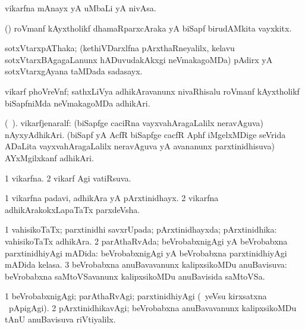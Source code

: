 \bentry
{} 
\gl{\nA}
\expl{}
\bmng
 vikarfna mAnayx yA uMbaLi yA nivAsa. 
\emng
\eentry

\bentry
{}
\gl{\nA}
\expl{}
\bmng
 (\roVkAyx) roVmanf kAyxtholikf dhamaRparxcAraka yA biSapf birudAMkita vayxkitx. 
\emng
\eentry

\bentry
{}
\gl{\nA}
\expl{}
\bmng
 sotxVtarxpAThaka; (kethiVDarxlfna pArxthaRneyalilx, kelavu sotxVtarxBAgagaLanunx hADuvudakAkxgi neVmakagoMDa) pAdirx yA sotxVtarxgAyana taMDada sadasayx. 
\emng
\eentry

\bentry
{} 
\gl{\nA}
\expl{}
\bmng
 vikarf phoVreVnf; sathxLiVya adhikAravanunx nivaRhisalu roVmanf kAyxtholikf biSapfniMda neVmakagoMDa adhikAri. 
\emng
\eentry

\bentry
{} 
\gl{\nA}(\bava\ ). 
\bmng
 vikarfjenaralf: 
\banum
{} (\roVkAyx biSapfge caciRna vayxvahAragaLalilx neravAguva) nAyxyAdhikAri. 
 (biSapf yA AcfR biSapfge cacfR Aphf iMgelxMDige seVrida ADaLita vayxvahAragaLalilx neravAguva yA avananunx parxtinidhisuva) AYxMgilxkanf adhikAri. 
\eanum
\emng
\eentry

\bentry
{} 
\gl{\gu}
\expl{}
\bmng
\bnum
\num{1} vikarfna. 
\num{2} vikarf Agi vatiRsuva. 
\enum
\emng
\eentry

\bentry
{} 
\gl{\nA}
\expl{}
\bmng
\bnum
\num{1} vikarfna padavi, adhikAra yA pArxtinidhayx. 
\num{2} vikarfna adhikArakokxLapaTaTx parxdeVsha. 
\enum
\emng
\eentry

\bentry
{} 
\gl{\gu}
\expl{}
\bmng
\bnum
\num{1} vahisikoTaTx; parxtinidhi savxrUpada; pArxtinidhayxda; pArxtinidhika:  vahisikoTaTx adhikAra. 
\num{2} parAthaRvAda; beVrobabxnigAgi yA beVrobabxna parxtinidhiyAgi mADida:  beVrobabxnigAgi yA beVrobabxna parxtinidhiyAgi mADida kelasa. 
\num{3} beVrobabxna anuBavavanunx kalipxsikoMDu anuBavisuva:  beVrobabxna saMtoVSavanunx kalipxsikoMDu anuBavisida saMtoVSa. 
\enum
\emng
\eentry

\bentry
{} 
\gl{\kirxvi}
\expl{}
\bmng
\bnum
\num{1} beVrobabxnigAgi; parAthaRvAgi; parxtinidhiyAgi (\kanmu\ yeVsu kirxsatxna \vi\ pApigAgi). 
\num{2} pArxtinidhikavAgi; beVrobabxna anuBavavanunx kalipxsikoMDu tAnU anuBavisuva riVtiyalilx. 
\enum
\emng
\eentry

